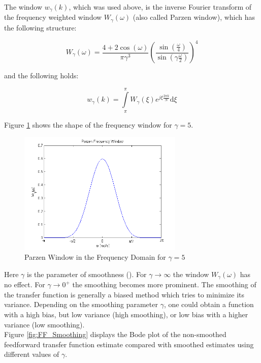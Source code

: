 The window $w_\gamma(k)$, which was used above, is the inverse Fourier transform of the frequency weighted window $W_\gamma(\omega)$ (also called Parzen window), which has the following structure:

\[W_\gamma(\omega) = \frac{4+2\cos(\omega)}{\pi \gamma^3}\left( \frac{\sin(\frac{\omega}{4})}{\sin(\gamma\frac{\omega}{2})}\right)^4 \]

and the following holds:

\[w_\gamma(k) = \int\limits_\pi^\pi W_\gamma(\xi)e^{j\xi \frac{2\pi k}{N}}\text{d}\xi\]

Figure \ref{fig:parzen} shows the shape of the frequency window for $\gamma = 5$.


\begin{figure}[h]
\centering
\includegraphics[width=0.7\textwidth]{pics/parzen}
\caption{Parzen Window in the Frequency Domain for $\gamma = 5$ }
\label{fig:parzen}
\end{figure}



Here $\gamma$ is the parameter of smoothness (\cite{ljung1999system}). For $\gamma \rightarrow \infty$ the window $W_\gamma(\omega)$ has no effect. For $\gamma \rightarrow 0^+$ the smoothing becomes more prominent. The smoothing of the transfer function is generally a biased method which tries to minimize its variance. Depending on the smoothing parameter $\gamma$, one could obtain a function with a high bias, but low variance (high smoothing), or low bias with a higher variance (low smoothing). \\

Figure \ref{fig:FF_Smoothing} displays the Bode plot of the non-smoothed feedforward transfer function estimate compared with smoothed estimates using different values of $\gamma$.


